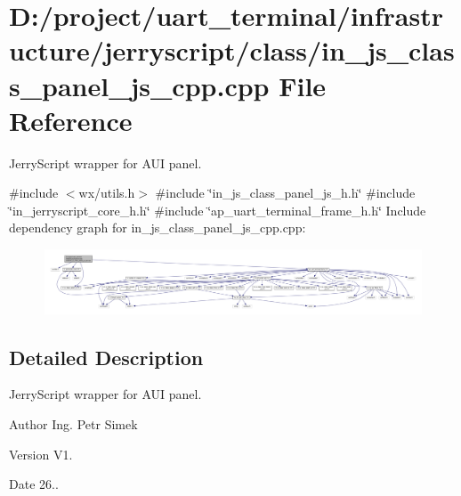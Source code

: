 \section{D\+:/project/uart\+\_\+terminal/infrastructure/jerryscript/class/in\+\_\+js\+\_\+class\+\_\+panel\+\_\+js\+\_\+cpp.cpp File Reference}
\label{in__js__class__panel__js__cpp_8cpp}


Jerry\+Script wrapper for A\+UI panel.  


{\ttfamily \#include $<$wx/utils.\+h$>$}\newline
{\ttfamily \#include \char`\"{}in\+\_\+js\+\_\+class\+\_\+panel\+\_\+js\+\_\+h.\+h\char`\"{}}\newline
{\ttfamily \#include \char`\"{}in\+\_\+jerryscript\+\_\+core\+\_\+h.\+h\char`\"{}}\newline
{\ttfamily \#include \char`\"{}ap\+\_\+uart\+\_\+terminal\+\_\+frame\+\_\+h.\+h\char`\"{}}\newline
Include dependency graph for in\+\_\+js\+\_\+class\+\_\+panel\+\_\+js\+\_\+cpp.\+cpp\+:\nopagebreak
\begin{figure}[H]
\begin{center}
\leavevmode
\includegraphics[width=350pt]{in__js__class__panel__js__cpp_8cpp__incl}
\end{center}
\end{figure}


\subsection{Detailed Description}
Jerry\+Script wrapper for A\+UI panel. 

\begin{DoxyAuthor}{Author}
Ing. Petr Simek 
\end{DoxyAuthor}
\begin{DoxyVersion}{Version}
V1. 
\end{DoxyVersion}
\begin{DoxyDate}{Date}
26.. 
\end{DoxyDate}
